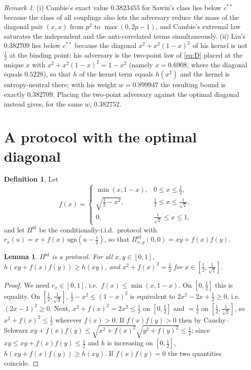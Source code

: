 \documentclass[11pt,a4paper]{article}
\newtheorem{lemma}[theorem]{Lemma}
\theoremstyle{definition}
\newtheorem{definition}[theorem]{Definition}
\theoremstyle{remark}
\newtheorem{remark}[theorem]{Remark}
\newcommand{\ent}{h}
\newcommand{\id}{\mathrm{id}}
\begin{document}
\begin{remark}\label{rem:literature}
(i) Cambie's exact value $0.3823455$ for Sawin's class lies below $c^{**}$ because the class of all couplings also lets the adversary reduce the mass of the diagonal pair $(x,x)$ from $p^2$ to $\max(0,2p-1)$, and Cambie's extremal law saturates the independent and the anti-correlated terms simultaneously. (ii) Liu's $0.382709$ lies below $c^{**}$ because the diagonal $x^2+x^2(1-x)^2$ of his kernel is not $\frac12$ at the binding point: his adversary is the two-point law of \eqref{eq:D} placed at the unique $x$ with $x^2+x^2(1-x)^2=1-x^2$ (namely $x=0.6908$, where the diagonal equals $0.5228$), so that $\ent$ of the kernel term equals $\ent(x^2)$ and the kernel is entropy-neutral there; with his weight $w=0.899947$ the resulting bound is exactly $0.382709$. Placing the two-point adversary against the optimal diagonal instead gives, for the same $w$, $0.382752$.
\end{remark}

\section{A protocol with the optimal diagonal}\label{sec:protocol}
\begin{definition}\label{def:ideal}
Let
\[f(x)=\begin{cases}\min(x,1-x),&0\le x\le\frac12,\\ \sqrt{\frac12-x^2},&\frac12\le x\le\frac1{\sqrt2},\\ 0,&\frac1{\sqrt2}\le x\le1,\end{cases}\]
and let $\Pi^{\id}$ be the conditionally-i.i.d.\ protocol with $r_x(u)=x+f(x)\,\mathrm{sgn}(u-\tfrac12)$, so that $\Pi^{\id}_{x,y}(0,0)=xy+f(x)f(y)$.
\end{definition}

\begin{lemma}\label{lem:ideal}
$\Pi^{\id}$ is a protocol. For all $x,y\in[0,1]$, $\ent(xy+f(x)f(y))\ge\ent(xy)$, and $x^2+f(x)^2=\frac12$ for $x\in[\frac12,\frac1{\sqrt2}]$.
\end{lemma}
\begin{proof}
We need $r_x\in[0,1]$, i.e.\ $f(x)\le\min(x,1-x)$. On $[0,\frac12]$ this is equality. On $[\frac12,\frac1{\sqrt2}]$, $\frac12-x^2\le(1-x)^2$ is equivalent to $2x^2-2x+\frac12\ge0$, i.e.\ $(2x-1)^2\ge0$. Next, $x^2+f(x)^2=2x^2\le\frac12$ on $[0,\frac12]$ and $=\frac12$ on $[\frac12,\frac1{\sqrt2}]$, so $x^2+f(x)^2\le\frac12$ wherever $f(x)>0$. If $f(x)f(y)>0$ then by Cauchy--Schwarz $xy+f(x)f(y)\le\sqrt{x^2+f(x)^2}\sqrt{y^2+f(y)^2}\le\frac12$; since $xy\le xy+f(x)f(y)\le\frac12$ and $\ent$ is increasing on $[0,\frac12]$, $\ent(xy+f(x)f(y))\ge\ent(xy)$. If $f(x)f(y)=0$ the two quantities coincide.
\end{proof}
\end{document}
